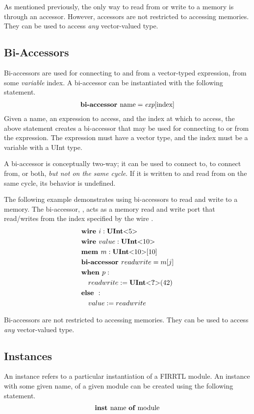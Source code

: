 \documentclass[10pt]{article}
\begin{document}
As mentioned previously, the only way to read from or write to a memory is through an accessor.
However, accessors are not restricted to accessing memories.
They can be used to access {\em any} vector-valued type. 


\subsection{Bi-Accessors}
Bi-accessors are used for connecting to and from a vector-typed expression, from some {\em variable} index.
A bi-accessor can be instantiated with the following statement.
\[
\begin{aligned}
&\text{\bf bi-accessor\ } \text{name} = \text{\em exp}[\text{index}] \\
\end{aligned}
\]
Given a name, an expression to access, and the index at which to access, the above statement creates a bi-accessor that may be used for connecting to or from the expression.
The expression must have a vector type, and the index must be a variable with a UInt type.

A bi-accessor is conceptually two-way; it can be used to connect to, to connect from, or both, {\em but not on the same cycle}.
If it is written to and read from on the same cycle, its behavior is undefined.

The following example demonstrates using bi-accessors to read and write to a memory.
The bi-accessor, , acts as a memory read and write port that read/writes from the index specified by the wire .
\[
\begin{aligned}
&\text{\bf wire\ } i : \text{\bf UInt}\text{\bf $<$} 5 \text{\bf $>$} \\
&\text{\bf wire\ } value : \text{\bf UInt}\text{\bf $<$} 10 \text{\bf $>$} \\
&\text{\bf mem\ } m : \text{\bf UInt}\text{\bf $<$} 10 \text{\bf $>$}[10] \\
&\text{\bf bi-accessor\ } readwrite = m[j] \\
&\text{\bf when\ } p : \\
&\quad readwrite := \text{\bf UInt}\text{\bf $<$} \text{\bf ?} \text{\bf $>$}(42) \\
&\text{\bf else\ } : \\
&\quad value := readwrite \\
\end{aligned}
\]

Bi-accessors are not restricted to accessing memories.
They can be used to access {\em any} vector-valued type. 

\subsection{Instances}
An instance refers to a particular instantiation of a FIRRTL module.
An instance with some given name, of a given module can be created using the following statement.
\[
\begin{aligned}
\text{\bf inst\ } \text{name } \text{\bf of\ } \text{module}
\end{aligned}
\]
\end{document}

